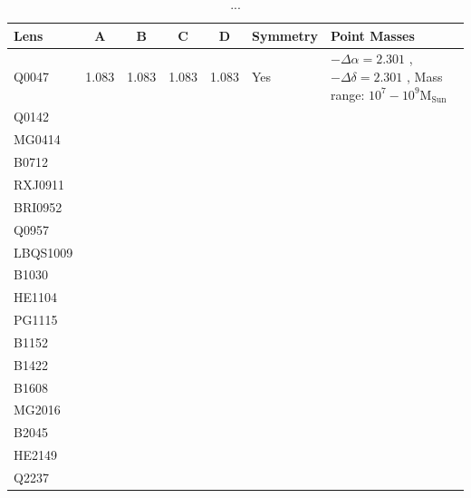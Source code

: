 \documentclass[useAMS,usenatbib]{mn2e}
\begin{document}
\begin{table}
 \begin{center}
  \begin{tabular}{l c c c c l l}
   Lens & A & B & C & D & Symmetry & Point Masses\\ \hline \hline
   Q0047 & 1.083 & 1.083 & 1.083 & 1.083 & Yes & $-\Delta\alpha = 2.301$ , $-\Delta\delta = 2.301$ , Mass range: $10^{7}-10^{9} \mathrm{M_{Sun}}$\\
   Q0142 & & & & & & \\
   MG0414 & & & & & & \\
   B0712 & & & & & & \\
   RXJ0911 & & & & & & \\
   BRI0952 & & & & & & \\
   Q0957 & & & & & & \\
   LBQS1009 & & & & & & \\
   B1030 & & & & & & \\
   HE1104 & & & & & & \\
   PG1115 & & & & & \\
   B1152 & & & & & \\
   B1422 & & & & & \\
   B1608 & & & & & \\
   MG2016 & & & & & \\
   B2045 & & & & & \\
   HE2149 & & & & & \\
   Q2237 & & & & & \\
  \end{tabular}
  \caption{...}
  \label{tab:lensparameters}
 \end{center}
\end{table}
\end{document}
